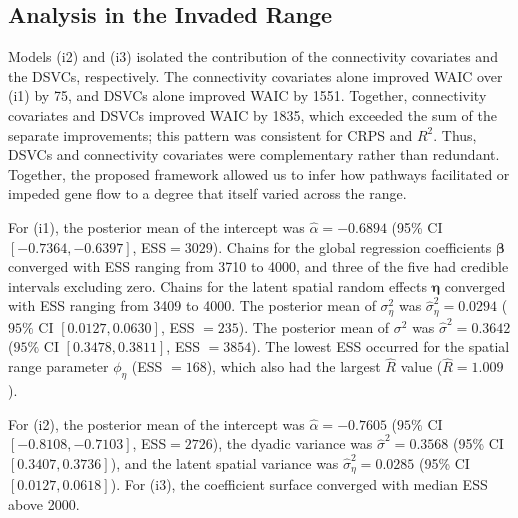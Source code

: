 \documentclass{article}
\begin{document}
\subsection{Analysis in the Invaded Range}

Models (i2) and (i3) isolated the contribution of the connectivity covariates and the DSVCs, respectively. The connectivity covariates alone improved WAIC over (i1) by 75, and DSVCs alone improved WAIC by 1551. Together, connectivity covariates and DSVCs improved WAIC by 1835, which exceeded the sum of the separate improvements; this pattern was consistent for CRPS and $R^2$. Thus, DSVCs and connectivity covariates were complementary rather than redundant. 
Together, the proposed framework allowed us to infer how pathways facilitated or impeded gene flow to a degree that itself varied across the range.

For (i1), the posterior mean of the intercept was $\hat\alpha=-0.6894$ (95\% CI $[-0.7364,-0.6397]$, ESS$=3029$). Chains for the global regression coefficients $\boldsymbol{\beta}$ converged with ESS ranging from 3710 to 4000, and three of the five had credible intervals excluding zero. 
Chains for the latent spatial random effects $\boldsymbol\eta$ converged with ESS ranging from 3409 to 4000.
The posterior mean of $\sigma^2_\eta$ was $\hat\sigma^2_\eta=0.0294$ ($95\%$ CI $[0.0127,0.0630]$, ESS $=235$). The posterior mean of $\sigma^2$ was $\hat\sigma^2=0.3642$ ($95\%$ CI $[0.3478,0.3811]$, ESS $=3854$). The lowest ESS occurred for the spatial range parameter $\phi_\eta$ (ESS $=168$), which also had the largest $\hat{R}$ value ($\hat{R}=1.009$).  

For (i2), the posterior mean of the intercept was $\hat\alpha=-0.7605$ ($95\%$ CI $[-0.8108,-0.7103]$, ESS$=2726$), the dyadic variance was $\hat{\sigma}^2=0.3568$ (95\% CI $[0.3407,0.3736]$), and the latent spatial variance was $\hat{\sigma}^2_\eta=0.0285$ (95\% CI $[0.0127,0.0618]$).
For (i3), the coefficient surface converged with median ESS above 2000.
\end{document}
